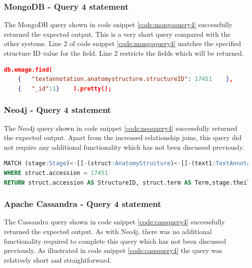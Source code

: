 \subsubsection*{MongoDB - Query 4 statement}\label{mongoquery4statement}
The MongoDB query shown in code snippet \ref{code:mongoquery4} successfully returned the expected output. This is a very short query compared with the other systems. Line 2 of code snippet \ref{code:mongoquery4} matches the specified structure ID value for the field. Line 2 restricts the fields which will be returned.

\begin{lstlisting}[language=json, caption=MongoDB query 4 statement. What is expressed in structure X?., label=code:mongoquery4]
db.emage.find(
	{	"textannotation.anatomystructure.structureID": 17451	},
	{	"_id":1}	).pretty();
\end{lstlisting}

\subsubsection*{Neo4j - Query 4 statement}\label{neoquery4statement}
The Neo4j query shown in code snippet \ref{code:neoquery4} successfully returned the expected output. Apart from the increased relationship joins, this query did not require any additional functionality which has not been discussed previously.

\begin{lstlisting}[language=SQL, caption=Neo4j query 4 statement. What is expressed in structure X?., label=code:neoquery4]
MATCH (stage:Stage)<-[]-(struct:AnatomyStructure)<-[]-(text1:TextAnnotation)-[]->(assay:Assay)
WHERE struct.accession = 17451
RETURN struct.accession AS StructureID, struct.term AS Term,stage.theilerStage AS TheilerStage, assay.emageID AS EMAGEID
\end{lstlisting}

\subsubsection*{Apache Cassandra - Query 4 statement}\label{cassquery4statement}
The Cassandra query shown in code snippet \ref{code:cassquery4} successfully returned the expected output. As with Neo4j, there was no additional functionality required to complete this query which has not been discussed previously. As illustrated in code snippet \ref{code:cassquery4} the query was relatively short and straightforward.

